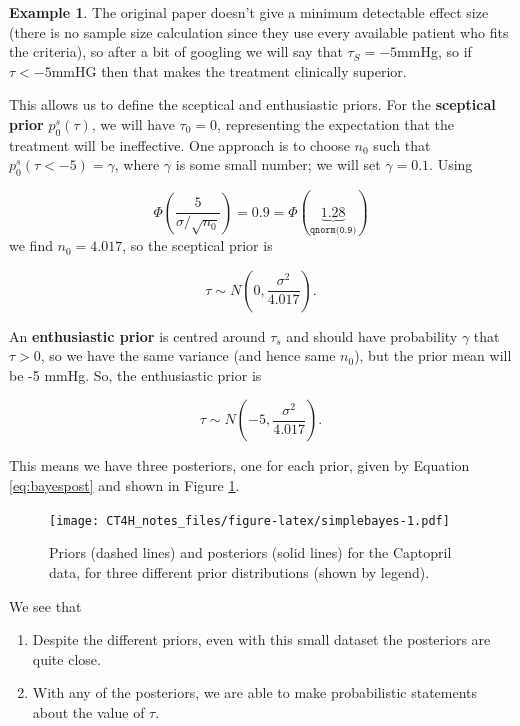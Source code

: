 \documentclass[
  openany]{book}
\providecommand{\tightlist}{%
  \setlength{\itemsep}{0pt}\setlength{\parskip}{0pt}}
\theoremstyle{definition}
\theoremstyle{definition}
\newtheorem{example}{Example}[chapter]
\theoremstyle{definition}
\theoremstyle{definition}
\theoremstyle{remark}
\begin{document}
\begin{example}
The original paper \citet{hommel1986effect} doesn't give a minimum detectable effect size (there is no sample size calculation since they use every available patient who fits the criteria), so after a bit of googling we will say that \(\tau_S=-5\)mmHg, so if \(\tau<-5\)mmHG then that makes the treatment clinically superior.

This allows us to define the sceptical and enthusiastic priors. For the \textbf{sceptical prior} \(p^s_0\left(\tau\right)\), we will have \(\tau_0=0\), representing the expectation that the treatment will be ineffective. One approach is to choose \(n_0\) such that \(p^s_0\left(\tau<-5\right) = \gamma\), where \(\gamma\) is some small number; we will set \(\gamma=0.1\). Using

\[\Phi\left(\frac{5}{\sigma/\sqrt{n_0}}\right) = 0.9 = \Phi\left(\underbrace{1.28}_{\texttt{qnorm(0.9)}} \right)\]
we find \(n_0 = 4.017\), so the sceptical prior is

\[\tau \sim N\left(0, \frac{\sigma^2}{4.017}\right).\]

An \textbf{enthusiastic prior} is centred around \(\tau_s\) and should have probability \(\gamma\) that \(\tau>0\), so we have the same variance (and hence same \(n_0\)), but the prior mean will be -5 mmHg. So, the enthusiastic prior is

\[\tau \sim N\left(-5, \frac{\sigma^2}{4.017}\right).\]

This means we have three posteriors, one for each prior, given by Equation \eqref{eq:bayespost} and shown in Figure \ref{fig:simplebayes}.

\begin{figure}
\centering
\texttt{[image: CT4H\_notes\_files/figure-latex/simplebayes-1.pdf]}
\caption{\label{fig:simplebayes}Priors (dashed lines) and posteriors (solid lines) for the Captopril data, for three different prior distributions (shown by legend).}
\end{figure}

We see that

\begin{enumerate}
\def\labelenumi{\arabic{enumi}.}
\tightlist
\item
  Despite the different priors, even with this small dataset the posteriors are quite close.
\item
  With any of the posteriors, we are able to make probabilistic statements about the value of \(\tau\).
\end{enumerate}

\end{example}
\end{document}
